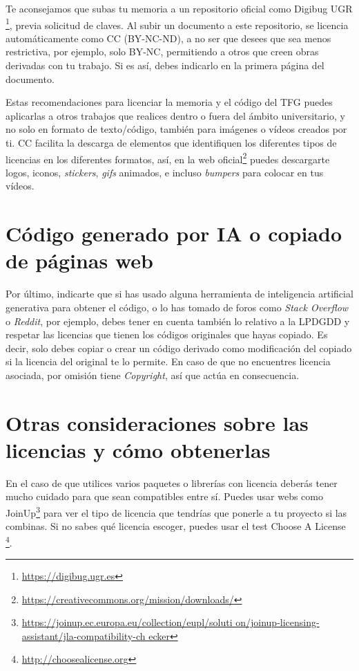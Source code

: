 Te aconsejamos que subas tu memoria a un repositorio oficial como Digibug UGR \footnote{\url{https://digibug.ugr.es}}, previa solicitud de claves. Al subir un documento a este repositorio, se licencia automáticamente como CC (BY-NC-ND), a no ser que desees que sea menos restrictiva, por ejemplo, solo BY-NC, permitiendo a otros que creen obras derivadas con tu trabajo. Si es así, debes indicarlo en la primera página del documento. 

Estas recomendaciones para licenciar la memoria y el código del TFG puedes aplicarlas a otros trabajos que realices dentro o fuera del ámbito universitario, y no solo en formato de texto/código, también para imágenes o vídeos creados por ti. CC facilita la descarga de elementos que identifiquen los diferentes tipos de licencias en los diferentes formatos, así, en la web oficial\footnote{\url{https://creativecommons.org/mission/downloads/}} puedes descargarte logos, iconos, \textit{stickers}, \textit{gifs} animados, e incluso \textit{bumpers} para colocar en tus vídeos.

\section{Código generado por IA o copiado de páginas web}

Por último, indicarte que si has usado alguna herramienta de inteligencia artificial generativa para obtener el código, o lo has tomado de foros como \textit{Stack Overflow} o \textit{Reddit}, por ejemplo, debes tener en cuenta también lo relativo a la LPDGDD y respetar las licencias que tienen los códigos originales que hayas copiado. Es decir, solo debes copiar o crear un código derivado como modificación del copiado si la licencia del original te lo permite. En caso de que no encuentres licencia asociada, por omisión tiene \textit{Copyright}, así que actúa en consecuencia.


\section{Otras consideraciones sobre las licencias y cómo obtenerlas}

En el caso de que utilices varios paquetes o librerías con licencia deberás tener mucho cuidado para que sean compatibles entre sí. Puedes usar webs como JoinUp\footnote{\url{https://joinup.ec.europa.eu/collection/eupl/soluti on/joinup-licensing-assistant/jla-compatibility-ch ecker}} para ver el tipo de licencia que tendrías que ponerle a tu proyecto si las combinas. Si no sabes qué licencia escoger, puedes usar el test Choose A License \footnote{\url{http://choosealicense.org}}.

